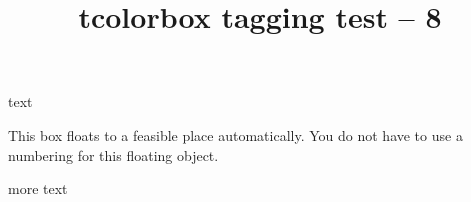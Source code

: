 \documentclass{article}
\title{tcolorbox tagging test -- 8}
\begin{document}
text
\begin{tcolorbox}[float, title=Floating box from float,
enhanced]
This box floats to a feasible place automatically. You do not have to
use a numbering for this floating object.
\end{tcolorbox}
more text
\end{document}
